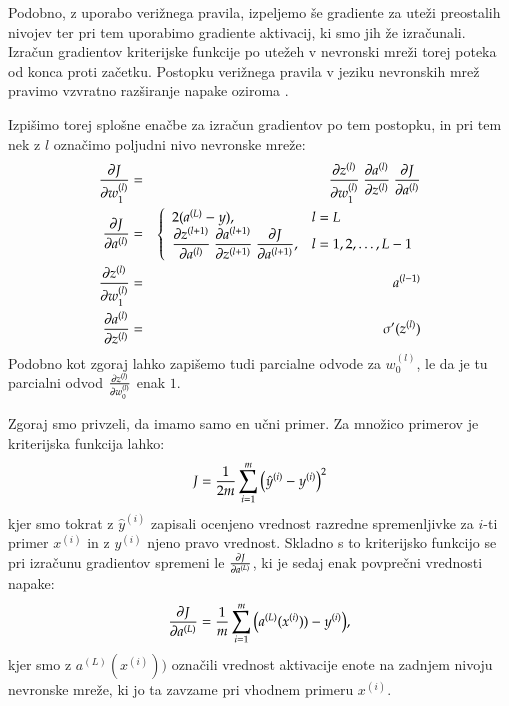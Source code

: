 Podobno, z uporabo verižnega pravila, izpeljemo še gradiente za uteži preostalih nivojev ter pri tem uporabimo gradiente aktivacij, ki smo jih že izračunali. Izračun gradientov kriterijske funkcije po utežeh v nevronski mreži torej poteka od konca proti začetku. Postopku verižnega pravila v jeziku nevronskih mrež pravimo vzvratno razširanje napake oziroma .

Izpišimo torej splošne enačbe za izračun gradientov po tem postopku, in pri tem nek z $l$ označimo poljudni nivo nevronske mreže:
\begin{eqnarray}
  \pd{J}{w_1^{(l)}} & = & \pd{z^{(l)}}{w_1^{(l)}}\ \pd{a^{(l)}}{z^{(l)}}\ \pd{J}{a^{(l)}} \\
  \pd{J}{a^{(l)}} & = & \left\{
    \begin{array}{ll}
      2(a^{(L)}-y), & l=L \\   %
      \displaystyle
      \pd{z^{(l+1)}}{a^{(l)}}\ \pd{a^{(l+1)}}{z^{(l+1)}}\ \pd{J}{a^{(l+1)}}, 
      & l=1,2,\ldots,L-1
    \end{array} \right. \\
  \pd{z^{(l)}}{w_1^{(l)}} & = & a^{(l-1)} \\
  \pd{a^{(l)}}{z^{(l)}} & = & \sigma'(z^{(l)})
\end{eqnarray}
\noindent Podobno kot zgoraj lahko zapišemo tudi parcialne odvode za $w_0^{(l)}$, le da je tu parcialni odvod $\frac{\partial z^{(l)}}{\partial w_0^{(l)}}$ enak $1$.

Zgoraj smo privzeli, da imamo samo en učni primer. Za množico primerov je kriterijska funkcija lahko:
\begin{equation}
J={1\over 2m}\sum_{i=1}^m \big( \hat{y}^{(i)} - y^{(i)}\big)^2  %
\end{equation}
\noindent kjer smo tokrat z $\hat{y}^{(i)}$ zapisali ocenjeno vrednost razredne spremenljivke za $i$-ti primer $x^{(i)}$ in z $y^{(i)}$ njeno pravo vrednost. Skladno s to kriterijsko funkcijo se pri izračunu gradientov spremeni le $\frac{\partial J}{\partial a^{(L)}}$, ki je sedaj enak povprečni vrednosti napake:
\begin{equation}
  \frac{\partial J}{\partial a^{(L)}} = {1\over m}\sum_{i=1}^m \big(a^{(L)}(x^{(i)}))-y^{(i)}\big),
\end{equation}
\noindent kjer smo z $a^{(L)}(x^{(i)}))$ označili vrednost aktivacije enote na zadnjem nivoju nevronske mreže, ki jo ta zavzame pri vhodnem primeru $x^{(i)}$.

